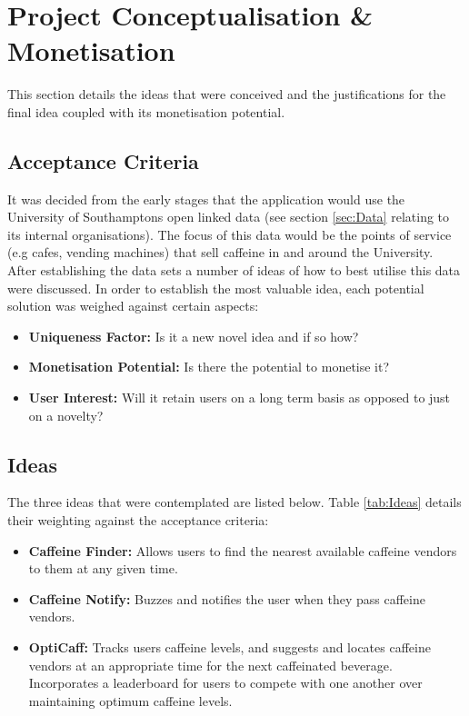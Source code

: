 \section{Project Conceptualisation \& Monetisation}

This section details the ideas that were conceived and the justifications for the final idea coupled with its monetisation potential. 

\subsection{Acceptance Criteria}
It was decided from the early stages that the application would use the University of Southamptons open linked data (see section \ref{sec:Data} relating to its internal organisations). 
The focus of this data would be the points of service (e.g cafes, vending machines) that sell caffeine in and around the University. 
After establishing the data sets a number of ideas of how to best utilise this data were discussed. 
In order to establish the most valuable idea, each potential solution was weighed against certain aspects: 

\begin{itemize}
	\item{\textbf{Uniqueness Factor:} Is it a new novel idea and if so how?}
	\item{\textbf{Monetisation Potential:} Is there the potential to monetise it?}
	\item{\textbf{User Interest:} Will it retain users on a long term basis as opposed to just on a novelty?}
\end{itemize}

\subsection{Ideas}
The three ideas that were contemplated are listed below. Table \ref{tab:Ideas} details their weighting against the acceptance criteria:

\begin{itemize}
	\item{\textbf{Caffeine Finder:} Allows users to find the nearest available caffeine vendors to them at any given time.}
	\item{\textbf{Caffeine Notify:} Buzzes and notifies the user when they pass caffeine vendors.}
	\item{\textbf{OptiCaff:} Tracks users caffeine levels, and suggests and locates caffeine vendors at an appropriate time for the next caffeinated beverage. Incorporates a leaderboard for users to compete with one another over maintaining optimum caffeine levels.}
\end{itemize}

